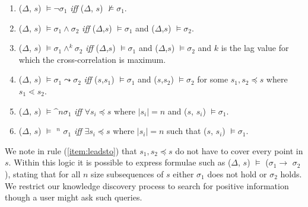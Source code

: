 \begin{enumerate}


\item ($\Delta$, $s$) $\models \neg  \sigma_1$ {
\em iff } ($\Delta$, $s$) $\not\models \sigma_1$.



\item ($\Delta$, $s$) $\models \sigma_1 \wedge \sigma_2$ { \em iff }
($\Delta$,$s$) 
$\models \sigma_1$ and ($\Delta$,$s$) $\models \sigma_2$.



\item ($\Delta$, $s$) $\models \sigma_1 \wedge^k \sigma_2$ { \em iff }
($\Delta$,$s$) 
$\models \sigma_1$ and ($\Delta$,$s$) $\models \sigma_2$ and $k$ is
the lag value for which the cross-correlation is maximum.


\item\label{item:leadsto} ($\Delta$, $s$) $\models \sigma_1 \leadsto \sigma_2$ { \em iff } ($s$,$s_1$)
$\models \sigma_1$ and ($s$,$s_2$) $\models \sigma_2$ for some $s_1,s_2 \preceq 
s$ where $s_1 \lessdot s_2$.




\item\label{item:fixed} ($\Delta$, $s$) $\models \bm^n \sigma_1$ { \em
iff }
$\forall s_i \preceq  s$ where $\mid s_i \mid = n$ and ($s$, $s_i$) $\models \sigma_1$.




\item\label{item:guarantee} ($\Delta$, $s$) $\models$ \diam$^n$
$\sigma_1$ { \em iff }
$\exists s_i \preceq s$ where $\mid s_i \mid = n$ such that ($s$,
$s_i$) $\models \sigma_1$.

\end{enumerate}

We note in rule (\ref{item:leadsto}) that $s_1,s_2 \preceq 
s$ do not have to cover every point in $s$.
Within this logic it is possible to express formulae such as
($\Delta$, $s$) $\models$  ($\sigma_1
\to$ $\sigma_2$), stating that for all $n$ size subsequences of $s$
either $\sigma_1$ does not hold or $\sigma_2$ holds.
We restrict our knowledge discovery process to
search for positive information though a user might ask such queries.

